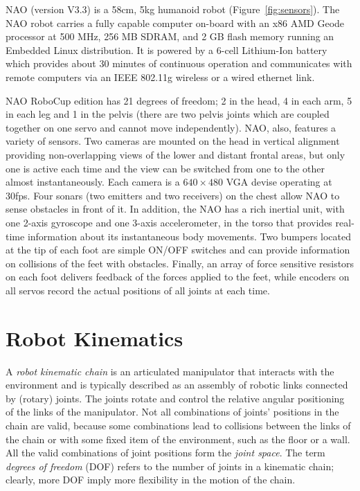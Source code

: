 NAO (version V3.3) is a 58cm, 5kg humanoid robot (Figure~\ref{fig:sensors}). The NAO robot carries a fully capable computer on-board with an x86 AMD Geode processor at 500 MHz, 256 MB SDRAM, and 2 GB flash memory running an Embedded Linux distribution. It is powered by a 6-cell Lithium-Ion battery which provides about 30 minutes of continuous operation and communicates with remote computers via an IEEE 802.11g wireless or a wired ethernet link. 

NAO RoboCup edition has 21 degrees of freedom; 2 in the head, 4 in each arm, 5 in each leg and 1 in the pelvis (there are two pelvis joints which are coupled together on one servo and cannot move independently). NAO, also, features a variety of sensors. Two cameras are mounted on the head in vertical alignment providing non-overlapping views of the lower and distant frontal areas, but only one is active each time and the view can be switched from one to the other almost instantaneously. Each camera is a $640 \times 480$ VGA devise operating at 30fps. Four sonars (two emitters and two receivers) on the chest allow NAO to sense obstacles in front of it. In addition, the NAO has a rich inertial unit, with one 2-axis gyroscope and one 3-axis accelerometer, in the torso that provides real-time information about its instantaneous body movements. Two bumpers located at the tip of each foot are simple ON/OFF switches and can provide information on collisions of the feet with obstacles. Finally, an array of force sensitive resistors on each foot delivers feedback of the forces applied to the feet, while encoders on all servos record the actual positions of all joints at each time.



\section{Robot Kinematics}
A \textit{robot kinematic chain} is an articulated manipulator that interacts with the environment and is typically described as an assembly of robotic links connected by (rotary) joints. The joints rotate and control the relative angular positioning of the links of the manipulator. Not all combinations of joints' positions in the chain are valid, because some combinations lead to collisions between the links of the chain or with some fixed item of the environment, such as the floor or a wall. All the valid combinations of joint positions form the \textit{joint space}. The term \textit{degrees of freedom} (DOF) refers to the number of joints in a kinematic chain; clearly, more DOF imply more flexibility in the motion of the chain. 

